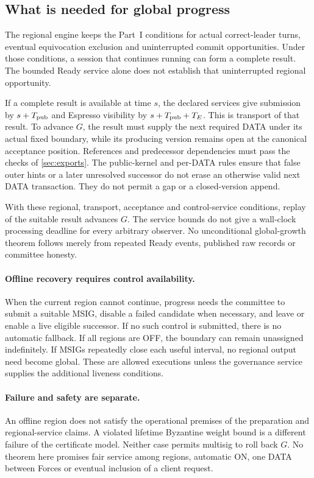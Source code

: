 \subsection{What is needed for global progress}
\label{sec:v4-global-progress}
The regional engine keeps the Part~I conditions for actual correct-leader
turns, eventual equivocation exclusion and uninterrupted commit
opportunities. Under those conditions, a session that continues running
can form a complete result. The bounded Ready service alone does not
establish that uninterrupted regional opportunity.

If a complete result is available at time $s$, the declared services give
submission by $s+T_{\rm pub}$ and Espresso visibility by
$s+T_{\rm pub}+T_E$. This is transport of that result. To advance $G$,
the result must supply the next required DATA under its actual fixed
boundary, while its producing version remains open at the canonical
acceptance position. References and predecessor dependencies must pass
the checks of \cref{sec:exports}.
The public-kernel and per-DATA rules ensure that false outer hints or
a later unresolved successor do not erase an otherwise valid next
DATA transaction. They do not permit a gap or a closed-version append.

With these regional, transport, acceptance and control-service conditions,
replay of the suitable result advances $G$. The service bounds do not
give a wall-clock processing deadline for every arbitrary observer.
No unconditional global-growth theorem follows merely from repeated
Ready events, published raw records or committee honesty.

\paragraph{Offline recovery requires control availability.}
When the current region cannot continue, progress needs the committee
to submit a suitable MSIG, disable a failed candidate when necessary,
and leave or enable a live eligible successor. If no such control is
submitted, there is no automatic fallback. If all regions are OFF,
the boundary can remain unassigned indefinitely. If MSIGs repeatedly
close each useful interval, no regional output need become global.
These are allowed executions unless the governance service supplies
the additional liveness conditions.

\paragraph{Failure and safety are separate.}
An offline region does not satisfy the operational premises of the
preparation and regional-service claims. A violated lifetime Byzantine
weight bound is a different failure of the certificate model.
Neither case permits multisig to roll back $G$.
No theorem here promises fair service among regions, automatic ON,
one DATA between Forces or eventual inclusion of a client request.
